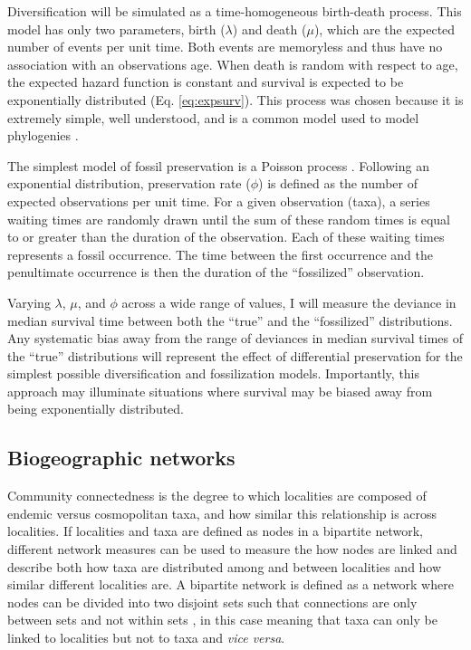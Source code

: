 \documentclass[12pt,letterpaper]{article}
\begin{document}
Diversification will be simulated as a time-homogeneous birth-death process. This model has only two parameters, birth (\(\lambda\)) and death (\(\mu\)), which are the expected number of events per unit time. Both events are memoryless and thus have no association with an observations age. When death is random with respect to age, the expected hazard function is constant and survival is expected to be exponentially distributed (Eq. \ref{eq:expsurv}). This process was chosen because it is extremely simple, well understood, and is a common model used to model phylogenies \citep{Kendall1948,Nee1994a,Nee2006b,Raup1974a}. 

The simplest model of fossil preservation is a Poisson process \citep{Foote1996e,Foote1997c,Solow1997,Strauss1989}. Following an exponential distribution, preservation rate (\(\phi\)) is defined as the number of expected observations per unit time. For a given observation (taxa), a series waiting times are randomly drawn until the sum of these random times is equal to or greater than the duration of the observation. Each of these waiting times represents a fossil occurrence. The time between the first occurrence and the penultimate occurrence is then the duration of the ``fossilized'' observation.

Varying \(\lambda\), \(\mu\), and \(\phi\) across a wide range of values, I will measure the deviance in median survival time between both the ``true'' and the ``fossilized'' distributions. Any systematic bias away from the range of deviances in median survival times of the ``true'' distributions will represent the effect of differential preservation for the simplest possible diversification and fossilization models. Importantly, this approach may illuminate situations where survival may be biased away from being exponentially distributed.


\subsection{Biogeographic networks} \label{sec:bionet}
Community connectedness is the degree to which localities are composed of endemic versus cosmopolitan taxa, and how similar this relationship is across localities. If localities and taxa are defined as nodes in a bipartite network, different network measures can be used to measure the how nodes are linked and describe both how taxa are distributed among and between localities and how similar different localities are. A bipartite network is defined as a network where nodes can be divided into two disjoint sets such that connections are only between sets and not within sets \citep{Diestel2005}, in this case meaning that taxa can only be linked to localities but not to taxa and \textit{vice versa}.
\end{document}
